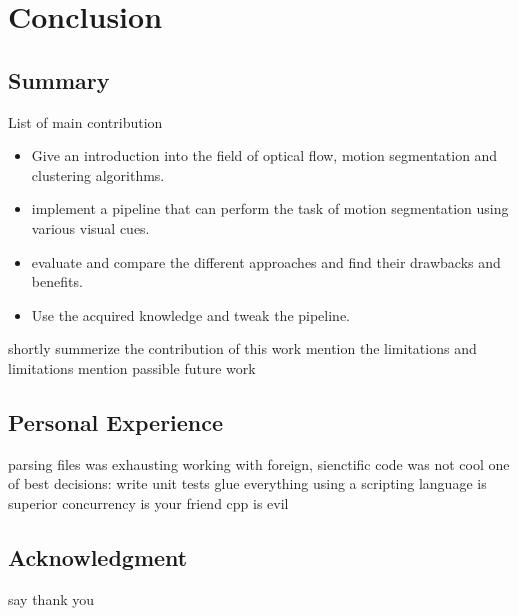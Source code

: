 \chapter{Conclusion}
\section{Summary}

List of main contribution
\begin{itemize}
  \item Give an introduction into the field of optical flow, motion segmentation and clustering algorithms.
  \item implement a pipeline that can perform the task of motion segmentation using various visual cues.
  \item evaluate and compare the different approaches and find their drawbacks and benefits.
  \item Use the acquired knowledge and tweak the pipeline.
\end{itemize}

shortly summerize the contribution of this work
mention the limitations and limitations
mention passible future work

\section{Personal Experience}
parsing files was exhausting
working with foreign, sienctific code was not cool
one of best decisions: write unit tests
glue everything using a scripting language is superior
concurrency is your friend
cpp is evil

\section{Acknowledgment}
say thank you